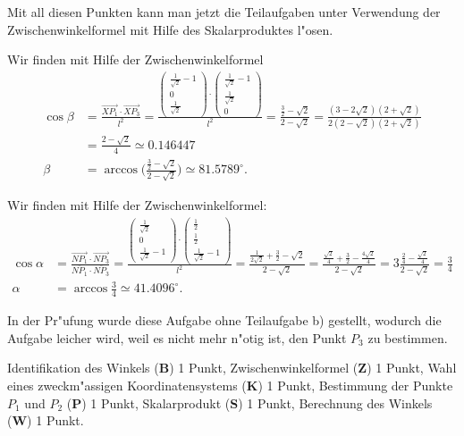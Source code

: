 \begin{loesung}
Mit all diesen Punkten kann man jetzt die Teilaufgaben unter Verwendung
der Zwischenwinkelformel mit Hilfe des Skalarproduktes l"osen.
\begin{teilaufgaben}
\item
Wir finden mit Hilfe der Zwischenwinkelformel
\begin{align*}
\cos\beta
&=
\frac{\overrightarrow{XP_1}\cdot\overrightarrow{XP_3}}{l^2}
=
\frac{
\begin{pmatrix}\frac1{\sqrt{2}}-1\\0\\\frac1{\sqrt{2}}\end{pmatrix}
\cdot
\begin{pmatrix}\frac1{\sqrt{2}}-1\\\frac1{\sqrt{2}}\\0\end{pmatrix}
}{l^2}
=
\frac{\frac32-\sqrt{2}}{2-\sqrt{2}}
=
\frac{(3-2\sqrt{2})(2+\sqrt{2})}{2(2-\sqrt{2})(2+\sqrt{2})}
\\
&=
\frac{2-\sqrt{2}}{4}
\simeq
0.146447
\\
\beta
&=
\arccos \biggl(\frac{\frac32-\sqrt{2}}{2-\sqrt{2}}\biggr)
\simeq81.5789^\circ.
\end{align*}
\item
Wir finden mit Hilfe der Zwischenwinkelformel:
\begin{align*}
\cos\alpha
&=
\frac{\overrightarrow{NP_1}\cdot \overrightarrow{NP_3}}{
\overline{NP_1}\cdot\overline{NP_3}
}
=\frac{
\begin{pmatrix}\frac1{\sqrt{2}}\\0\\\frac1{\sqrt{2}}-1\end{pmatrix}
\cdot
\begin{pmatrix}\frac12\\\frac12\\\frac1{\sqrt{2}}-1\end{pmatrix}
}{l^2}
=
\frac{\frac1{2\sqrt{2}}+\frac32-\sqrt{2}}{2-\sqrt{2}}
=
\frac{\frac{\sqrt{2}}{4}+\frac32-\frac{4\sqrt{2}}{4}}{2-\sqrt{2}}
=
3 \frac{\frac24-\frac{\sqrt{2}}4}{2-\sqrt{2}}
=
\frac34
\\
\alpha
&=
\arccos\frac34\simeq41.4096^\circ.
\end{align*}
\end{teilaufgaben}
\end{loesung}

\begin{diskussion}
In der Pr"ufung wurde diese Aufgabe ohne Teilaufgabe b) gestellt, wodurch
die Aufgabe leicher wird, weil es nicht mehr n"otig ist, den Punkt
$P_3$ zu bestimmen.
\end{diskussion}

\begin{bewertung}
Identifikation des Winkels ({\bf B}) 1 Punkt,
Zwischenwinkelformel ({\bf Z}) 1 Punkt,
Wahl eines zweckm"assigen Koordinatensystems ({\bf K}) 1 Punkt,
Bestimmung der Punkte $P_1$ und $P_2$ ({\bf P}) 1 Punkt,
Skalarprodukt ({\bf S}) 1 Punkt,
Berechnung des Winkels ({\bf W}) 1 Punkt.
\end{bewertung}


